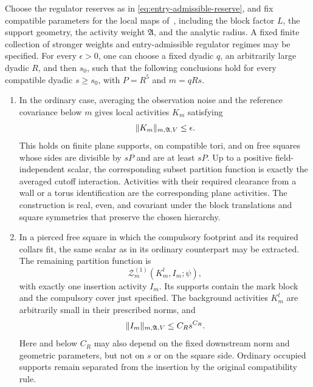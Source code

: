 \begin{proposition}\label{prop:entry}
Choose the regulator reserves as in
\eqref{eq:entry-admissible-reserve}, and fix compatible parameters
for the local maps of~\cite{B}, including the block factor $L$, the
support geometry, the activity weight $\mathfrak A$, and the analytic
radius. A fixed finite collection of stronger weights and
entry-admissible regulator regimes may be specified. For every
$\epsilon>0$, one can choose a fixed dyadic
$q$, an arbitrarily large dyadic $R$, and then $s_0$, such that the
following conclusions hold for every compatible dyadic $s\ge s_0$,
with $P=R^5$ and $m=qRs$.

\begin{enumerate}
\item In the ordinary case, averaging the observation noise and the
reference covariance below $m$ gives local activities $K_m$ satisfying
\begin{equation}\label{eq:entry-small}
                 \lVert K_m\rVert_{m,\mathfrak A,V}\le\epsilon.
\end{equation}
This holds on finite plane supports, on compatible tori, and on free
squares whose sides are divisible by $sP$ and are at least $sP$.
Up to a positive field-independent scalar, the corresponding subset
partition function is exactly the averaged cutoff interaction.
Activities with their required clearance from a wall or a torus
identification are the corresponding plane activities. The construction
is real, even, and covariant under the block translations and square
symmetries that preserve the chosen hierarchy.

\item In a pierced free square in which the compulsory footprint and
its required collars fit, the same scalar as in its ordinary
counterpart may be extracted. The remaining partition function is
\begin{equation}\label{eq:entry-linear-partition}
                    \mathcal Z_m^{(1)}(K_m^l,I_m;\psi),
\end{equation}
with exactly one insertion activity $I_m$. Its supports contain the
mark block and the compulsory cover just specified. The background
activities $K_m^l$ are arbitrarily small in their prescribed norms,
and
\begin{equation}\label{eq:entry-insertion}
                    \lVert I_m\rVert_{m,\mathfrak A,V}
                         \le C_R s^{C_R}.
\end{equation}
Here and below $C_R$ may also depend on the fixed downstream norm and
geometric parameters, but not on $s$ or on the square side. Ordinary
occupied supports remain separated from the insertion by the original
compatibility rule.


\end{enumerate}
\end{proposition}
